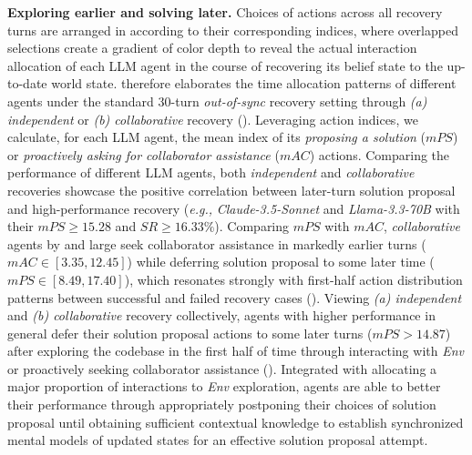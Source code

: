 \textbf{Exploring earlier and solving later.}
Choices of actions across all recovery turns are arranged in  according to their corresponding indices, where overlapped selections create a gradient of color depth to reveal the actual interaction allocation of each LLM agent in the course of recovering its belief state to the up-to-date world state. 
 therefore elaborates the time allocation patterns of different agents under the standard $30$-turn \textit{out-of-sync} recovery setting through \textit{(a) independent} or \textit{(b) collaborative} recovery ().
Leveraging action indices, we calculate, for each LLM agent, the mean index of its \textcolor{fig2_code}{\textit{proposing a solution} ($mPS$)} or \textcolor{fig2_ask}{\textit{proactively asking for collaborator assistance} ($mAC$)} actions. 
Comparing the performance of different LLM agents, both \textit{independent} and \textit{collaborative} recoveries showcase the positive correlation between later-turn solution proposal and high-performance recovery (\textit{e.g.,} \textit{Claude-3.5-Sonnet} and \textit{Llama-3.3-70B} with their $mPS \geq 15.28$ and $SR \geq 16.33\%$).
Comparing $mPS$ with $mAC$, \textit{collaborative} agents by and large seek collaborator assistance in markedly earlier turns ($mAC \in [3.35, 12.45]$) while deferring solution proposal to some later time ($mPS \in [8.49, 17.40]$), which resonates strongly with first-half action distribution patterns between successful and failed recovery cases (). 
Viewing \textit{(a) independent} and \textit{(b) collaborative} recovery collectively, agents with higher performance in general defer their solution proposal actions to some later turns ($mPS>14.87$) after exploring the codebase in the first half of time through \textcolor{fig2_env}{interacting with \textit{Env}} or \textcolor{fig2_ask}{proactively seeking collaborator assistance} (). Integrated with allocating a major proportion of interactions to \textcolor{fig2_env}{\textit{Env} exploration}, agents are able to better their performance through appropriately postponing their choices of solution proposal until obtaining sufficient contextual knowledge to establish synchronized mental models of updated states for an effective \textcolor{fig2_code}{solution proposal} attempt.



